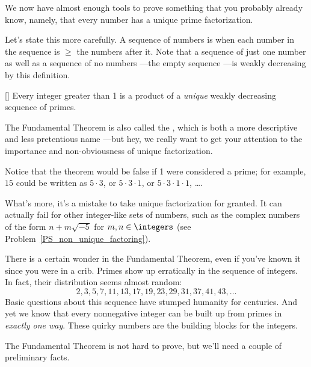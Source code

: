 We now have almost enough tools to prove something that you probably
already know, namely, that every number has a unique prime
factorization.  

Let's state this more carefully.  A sequence of numbers is
\emph{} when each number in the sequence is
$\ge$ the numbers after it.  Note that a sequence of just one number
as well as a sequence of no numbers ---the empty sequence ---is weakly
decreasing by this definition.

\begin{theorem}\label{thm:unique_factor}[]
Every integer greater than 1 is a product of a \emph{unique} weakly
decreasing sequence of primes.
\end{theorem}

The Fundamental Theorem is also called the , which is both a more descriptive and less pretentious name
---but hey, we really want to get your attention to the importance and
non-obviousness of unique factorization.

Notice that the theorem would be false if 1 were considered a prime;
for example, $15$ could be written as $5 \cdot 3$, or $5 \cdot 3 \cdot
1$, or $5 \cdot 3 \cdot 1 \cdot 1$, \dots.

What's more, it's a mistake to take unique factorization for granted.
It can actually fail for other integer-like sets of
numbers, such as the complex numbers of the form $n + m\sqrt{-5}$ for
$m,n \in \integers$ (see Problem~\ref{PS_non_unique_factoring}).


There is a certain wonder in the Fundamental Theorem, even if you've
known it since you were in a crib.  Primes show up erratically in the
sequence of integers.  In fact, their distribution seems almost
random:
\[
2, 3, 5, 7, 11, 13, 17, 19, 23, 29, 31, 37, 41, 43, \dots
\]
Basic questions about this sequence have stumped humanity for
centuries.  And yet we know that every nonnegative integer can be built up
from primes in \emph{exactly one way}.  These quirky numbers are the
building blocks for the integers.

The Fundamental Theorem is not hard to prove, but we'll need a couple
of preliminary facts.

